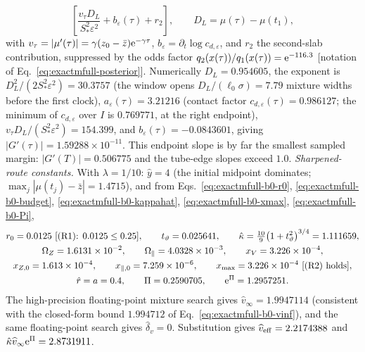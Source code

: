 \begin{remark}
\begin{equation}
  \left[\frac{v_\tau D_L}{S_*^2\varepsilon^2}
        +b_\varepsilon(\tau)+r_2\right],
 \qquad D_L=\mu(\tau)-\mu(t_1),
 \label{eq:exactmfull-b0-endpoint-slope}
\end{equation}
with \(v_\tau=|\mu'(\tau)|=\gamma(z_0-\bar z)\mathrm e^{-\gamma\tau}\),
\(b_\varepsilon=\partial_t\log c_{d,\varepsilon}\), and \(r_2\) the
second-slab contribution, suppressed by the odds factor
\(q_2(x(\tau))/q_1(x(\tau))=\mathrm e^{-116.3}\)
[notation of Eq.~\eqref{eq:exactmfull-posterior}].
Numerically \(D_L=0.954605\), the exponent is
\(D_L^2/(2S_*^2\varepsilon^2)=30.3757\) (the window opens
\(D_L/(\ell_0\sigma)=7.79\) mixture widths before the first clock),
\(a_\varepsilon(\tau)=3.21216\) (contact factor
\(c_{d,\varepsilon}(\tau)=0.986127\); the minimum of
\(c_{d,\varepsilon}\) over \(I\) is \(0.769771\), at the right endpoint),
\(v_\tau D_L/(S_*^2\varepsilon^2)=154.399\), and
\(b_\varepsilon(\tau)=-0.0843601\), giving
\(|G'(\tau)|=1.59288\times10^{-11}\).  This endpoint slope is by far the
smallest sampled margin: \(|G'(T)|=0.506775\) and the tube-edge slopes exceed
\(1.0\).
\emph{Sharpened-route constants.}  With \(\lambda=1/10\):
\(\hat y=4\) (the initial midpoint dominates;
\(\max_j|\mu(t_j)-\bar z|=1.4715\)), and from
Eqs.~\eqref{eq:exactmfull-b0-r0}, \eqref{eq:exactmfull-b0-budget},
\eqref{eq:exactmfull-b0-kappahat}, \eqref{eq:exactmfull-b0-xmax},
\eqref{eq:exactmfull-b0-Pi},
\begin{equation}
 \begin{gathered}
 r_0=0.0125\ \text{[(R1): }0.0125\le0.25\text{]},
 \qquad
 t_\vartheta=0.025641,
 \qquad
 \hat\kappa=\tfrac{10}{9}\bigl(1+t_\vartheta^2\bigr)^{3/4}=1.111659,\\
 \Omega_Z=1.6131\times10^{-2},
 \qquad
 \Omega_\parallel=4.0328\times10^{-3},
 \qquad
 x_V=3.226\times10^{-4},\\
 x_{Z,0}=1.613\times10^{-4},
 \qquad
 x_{\parallel,0}=7.259\times10^{-6},
 \qquad
 x_{\max}=3.226\times10^{-4}\ \text{[(R2) holds]},\\
 \hat r=a=0.4,
 \qquad
 \Pi=0.2590705,
 \qquad
 \mathrm e^{\Pi}=1.2957251.
 \end{gathered}
 \label{eq:exactmfull-b0-anchor-constants}
\end{equation}
The high-precision floating-point mixture search gives
\(\widehat v_\infty=1.9947114\)
(consistent with the closed-form bound \(1.994712\) of
Eq.~\eqref{eq:exactmfull-b0-vinf}), and the same floating-point search gives
\(\widehat\delta_v=0\).  Substitution gives
\(\widehat v_{\rm eff}=2.2174388\) and
\(\hat\kappa\widehat v_\infty\mathrm e^{\Pi}=2.8731911\).

\end{remark}

